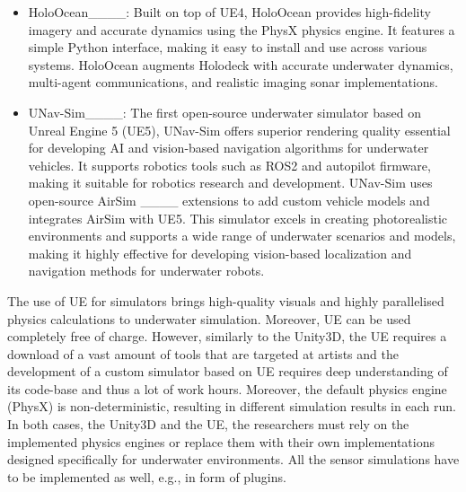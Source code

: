 \begin{itemize}
\item HoloOcean____: Built on top of UE4, HoloOcean provides high-fidelity imagery and accurate dynamics using the PhysX physics engine. It features a simple Python interface, making it easy to install and use across various systems. HoloOcean augments Holodeck with accurate underwater dynamics, multi-agent communications, and realistic imaging sonar implementations. 

\item UNav-Sim____: The first open-source underwater simulator based on Unreal Engine 5 (UE5), UNav-Sim offers superior rendering quality essential for developing AI and vision-based navigation algorithms for underwater vehicles. It supports robotics tools such as ROS2 and autopilot firmware, making it suitable for robotics research and development. UNav-Sim uses open-source AirSim ____ extensions to add custom vehicle models and integrates AirSim with UE5. This simulator excels in creating photorealistic environments and supports a wide range of underwater scenarios and models, making it highly effective for developing vision-based localization and navigation methods for underwater robots.
\end{itemize}

The use of UE for simulators brings high-quality visuals and highly parallelised physics calculations to underwater simulation. Moreover, UE can be used completely free of charge.
%
However, similarly to the Unity3D, the UE requires a download of a vast amount of tools that are targeted at artists and the development of a custom simulator based on UE requires deep understanding of its code-base and thus a lot of work hours. Moreover, the default physics engine (PhysX) is non-deterministic, resulting in different simulation results in each run.
% 
In both cases, the Unity3D and the UE, the researchers must rely on the implemented physics engines or replace them with their own implementations designed specifically for underwater environments. All the sensor simulations have to be implemented as well, e.g., in form of plugins.